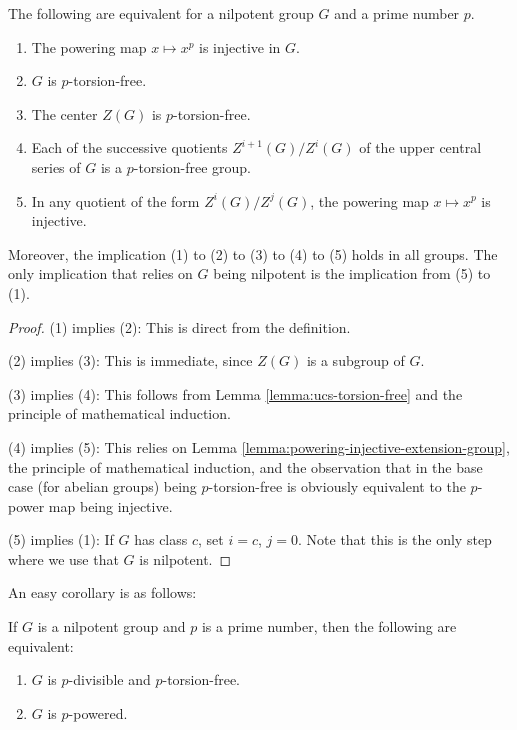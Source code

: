 \begin{theorem}\label{thm:torsion-free-equivalence-theorem}
  The following are equivalent for a nilpotent group $G$ and a prime
  number $p$.

  \begin{enumerate}
  \item The powering map $x \mapsto x^p$ is injective in $G$.
  \item $G$ is $p$-torsion-free.
  \item The center $Z(G)$ is $p$-torsion-free.
  \item Each of the successive quotients $Z^{i+1}(G)/Z^i(G)$ of the
    upper central series of $G$ is a $p$-torsion-free group.
  \item In any quotient of the form $Z^i(G)/Z^j(G)$, the powering map
    $x \mapsto x^p$ is injective.

  \end{enumerate}

  Moreover, the implication (1) to (2) to (3) to (4) to (5) holds in
  all groups. The only implication that relies on $G$ being nilpotent
  is the implication from (5) to (1).
\end{theorem}

\begin{proof}
  (1) implies (2): This is direct from the definition.

  (2) implies (3): This is immediate, since $Z(G)$ is a subgroup of $G$.

  (3) implies (4): This follows from Lemma \ref{lemma:ucs-torsion-free} and the
  principle of mathematical induction.

  (4) implies (5): This relies on Lemma
  \ref{lemma:powering-injective-extension-group}, the principle of
  mathematical induction, and the observation that in the base case
  (for abelian groups) being $p$-torsion-free is obviously equivalent
  to the $p$-power map being injective.

  (5) implies (1): If $G$ has class $c$, set $i = c$, $j =
  0$. Note that this is the only step where we use that $G$ is
  nilpotent.
\end{proof}

An easy corollary is as follows:

\begin{lemma}\label{lemma:nilpotent-powered-iff-d-t-f}
  If $G$ is a nilpotent group and $p$ is a prime number, then the following are equivalent:

  \begin{enumerate}
  \item $G$ is $p$-divisible and $p$-torsion-free.
  \item $G$ is $p$-powered.
  \end{enumerate}
\end{lemma}

